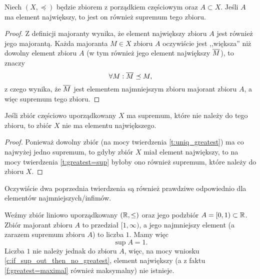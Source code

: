 \begin{theorem}
    \label{t:greatest=sup}
    Niech $(X, \preceq)$ będzie zbiorem z porządkiem częściowym oraz $A \subset X$. Jeśli $A$ ma element największy, to jest on również supremum tego zbioru.
\end{theorem}
\begin{proof}
    Z definicji majoranty wynika, że element największy zbioru $A$ jest również jego majorantą. Każda majoranta $M \in X$ zbioru $A$ oczywiście jest ,,większa'' niż dowolny element zbioru $A$ (w tym również jego element największy $\overline{M}$), to znaczy
    \[ \forall M : \overline{M} \preceq M, \]
    z czego wynika, że $\overline{M}$ jest elementem najmniejszym zbioru majorant zbioru $A$, a więc supremum tego zbioru.
\end{proof}

\begin{corollary}
    \label{c:if_sup_out_then_no_greatest}
    Jeśli zbiór częściowo uporządkowany $X$ ma supremum, które nie należy do tego zbioru, to zbiór $X$ nie ma elementu największego.
\end{corollary}
\begin{proof}
    Ponieważ dowolny zbiór (na mocy twierdzenia \ref{t:uniq_greatest}) ma co najwyżej jedno supremum, to gdyby zbiór $X$ miał element największy, to na mocy twierdzenia \ref{t:greatest=sup} byłoby ono również supremum, które należy do zbioru $X$.
\end{proof}

Oczywiście dwa poprzednia twierdzenia są również prawdziwe odpowiednio dla elementów najmniejszych/infimów.

\begin{example}
    Weźmy zbiór liniowo uporządkowany $(\mathbb R, \leq)$ oraz jego podzbiór $A = [0, 1) \subset \mathbb R$. Zbiór majorant zbioru $A$ to przedział $[1, \infty)$, a jego najmniejszy element (a zarazem supremum zbioru $A$) to liczba $1$. Mamy więc
    \[ \sup A = 1. \]
    Liczba $1$ nie należy jednak do zbioru $A$, więc, na mocy wniosku \ref{c:if_sup_out_then_no_greatest}, element największy (a z faktu \ref{f:greatest=maximal} również maksymalny) nie istnieje.
\end{example}

